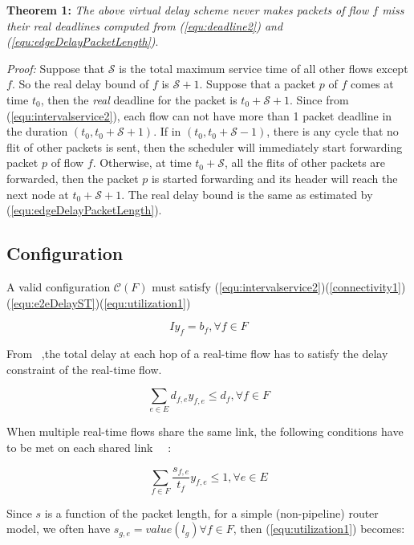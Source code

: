 \documentclass[conference, twocolumn]{IEEEtran}
\theoremstyle{definition}
\begin{document}
{\textbf{Theorem 1:}} {\em  The above virtual delay scheme never makes
packets of flow $f$ miss their real deadlines computed from
(\ref{equ:deadline2}) and (\ref{equ:edgeDelayPacketLength})}.

{\em Proof:} Suppose that $\mathcal{S}$ is the total maximum service time of all
other flows except $f$. So the real delay bound of $f$ is ${\mathcal S}+1$.
Suppose that a packet $p$ of $f$ comes at time $t_0$, then the {\em real}
deadline for the packet is $t_0+{\mathcal S}+1$. Since from
(\ref{equ:intervalservice2}), each flow can not have more than 1
packet deadline in the duration $(t_0, t_0+{\mathcal S}+1)$. If in
$(t_0, t_0+{\mathcal S}-1)$, there is any cycle that no flit of other packets is
sent, then the scheduler will immediately start forwarding packet $p$ of flow $f$.
Otherwise, at time $t_0+{\mathcal S}$, all the flits of other packets are
forwarded, then the packet $p$ is started forwarding and its header will reach
the next node at $t_0+{\mathcal S}+1$. The real delay bound is the same as
estimated by (\ref{equ:edgeDelayPacketLength}).

\subsection{Configuration}
A valid configuration ${\mathcal C}(F)$ must satisfy
(\ref{equ:intervalservice2})(\ref{connectivity1}) (\ref{equ:e2eDelayST})(\ref{equ:utilization1})

\begin{equation}\label{connectivity1} Iy_f=b_f,\forall f \in F
\end{equation}

From ~\cite{Ferrari90ascheme},the total delay at each hop of a real-time flow
has to satisfy the delay constraint of the real-time flow.

\begin{equation}\label{equ:e2eDelayST}
\sum_{e \in E}d_{f,e}y_{f,e} \leq d_f, \forall f \in F
\end{equation}

When multiple real-time flows share the same link, the following conditions
 have to be met on each shared link ~\cite{Ferrari90ascheme}~\cite{VermaJitter91}:

\begin{equation}\label{equ:utilization1}
\sum_{f \in F}\frac{s_{f,e}}{t_f}y_{f,e} \leq 1, \forall e \in E
\end{equation}

Since $s$ is a function of the packet length, for a simple (non-pipeline) router
model, we often have $s_{g,e}=value(l_g) \forall f \in F$, then
(\ref{equ:utilization1}) becomes:
\end{document}
